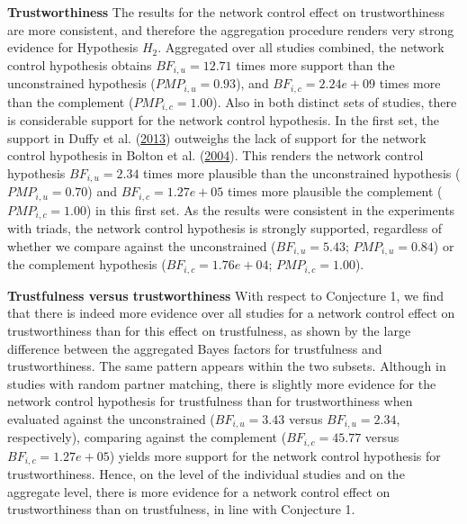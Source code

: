 \documentclass[
  11pt,
]{article}
\begin{document}
\textbf{Trustworthiness} \hspace{8pt}The results for the network control effect on trustworthiness are more consistent, and therefore the aggregation procedure renders very strong evidence for Hypothesis \(H_2\).
Aggregated over all studies combined, the network control hypothesis obtains \(BF_{i,u} = 12.71\) times more support than the unconstrained hypothesis (\(PMP_{i,u} = 0.93\)), and \(BF_{i,c} = 2.24e+09\) times more than the complement (\(PMP_{i,c} = 1.00\)).
Also in both distinct sets of studies, there is considerable support for the network control hypothesis.
In the first set, the support in Duffy et al. (\protect\hyperlink{ref-duffy2013social}{2013}) outweighs the lack of support for the network control hypothesis in Bolton et al. (\protect\hyperlink{ref-bolton_electronic_2004}{2004}).
This renders the network control hypothesis \(BF_{i,u} = 2.34\) times more plausible than the unconstrained hypothesis (\(PMP_{i,u} = 0.70\)) and \(BF_{i,c} = 1.27e+05\) times more plausible the complement (\(PMP_{i,c} = 1.00\)) in this first set.
As the results were consistent in the experiments with triads, the network control hypothesis is strongly supported, regardless of whether we compare against the unconstrained (\(BF_{i,u} = 5.43\); \(PMP_{i,u} = 0.84\)) or the complement hypothesis (\(BF_{i,c} = 1.76e+04\); \(PMP_{i,c} = 1.00\)).

\textbf{Trustfulness versus trustworthiness} \hspace{8pt} With respect to Conjecture 1, we find that there is indeed more evidence over all studies for a network control effect on trustworthiness than for this effect on trustfulness, as shown by the large difference between the aggregated Bayes factors for trustfulness and trustworthiness.
The same pattern appears within the two subsets.
Although in studies with random partner matching, there is slightly more evidence for the network control hypothesis for trustfulness than for trustworthiness when evaluated against the unconstrained (\(BF_{i,u} = 3.43\) versus \(BF_{i,u} = 2.34\), respectively), comparing against the complement (\(BF_{i,c} = 45.77\) versus \(BF_{i,c} = 1.27e+05\)) yields more support for the network control hypothesis for trustworthiness.
Hence, on the level of the individual studies and on the aggregate level, there is more evidence for a network control effect on trustworthiness than on trustfulness, in line with Conjecture 1.
\end{document}
